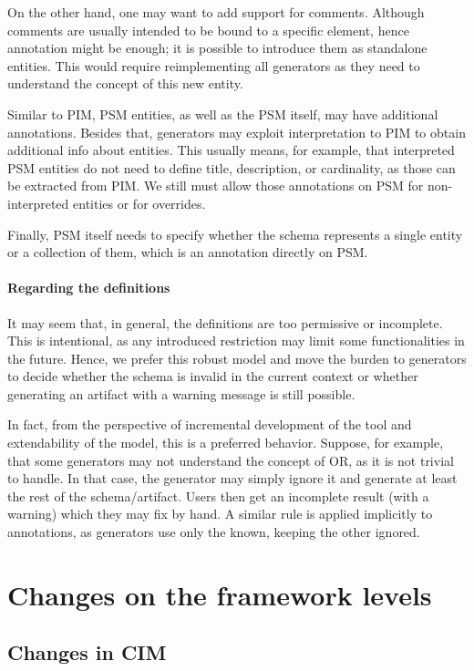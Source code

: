 On the other hand, one may want to add support for comments. Although comments are usually intended to be bound to a specific element, hence annotation might be enough; it is possible to introduce them as standalone entities. This would require reimplementing all generators as they need to understand the concept of this new entity.

\bigskip

Similar to PIM, PSM entities, as well as the PSM itself, may have additional annotations. Besides that, generators may exploit interpretation to PIM to obtain additional info about entities. This usually means, for example, that interpreted PSM entities do not need to define title, description, or cardinality, as those can be extracted from PIM. We still must allow those annotations on PSM for non-interpreted entities or for overrides.

Finally, PSM itself needs to specify whether the schema represents a single entity or a collection of them, which is an annotation directly on PSM.

\paragraph{Regarding the definitions} It may seem that, in general, the definitions are too permissive or incomplete. This is intentional, as any introduced restriction may limit some functionalities in the future. Hence, we prefer this robust model and move the burden to generators to decide whether the schema is invalid in the current context or whether generating an artifact with a warning message is still possible.

In fact, from the perspective of incremental development of the tool and extendability of the model, this is a preferred behavior. Suppose, for example, that some generators may not understand the concept of OR, as it is not trivial to handle. In that case, the generator may simply ignore it and generate at least the rest of the schema/artifact. Users then get an incomplete result (with a warning) which they may fix by hand. A similar rule is applied implicitly to annotations, as generators use only the known, keeping the other ignored.

\section{Changes on the framework levels}

\subsection{Changes in CIM}

